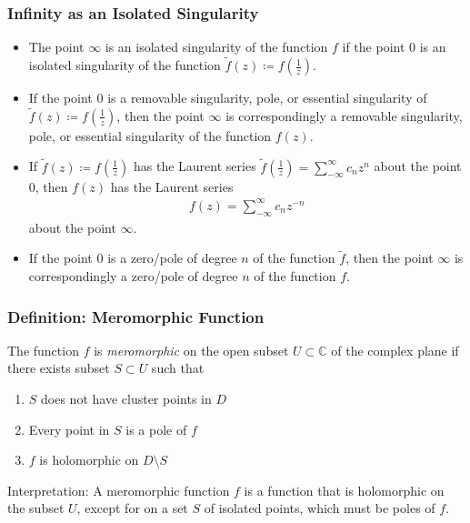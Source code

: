 \documentclass[11pt, a4paper]{article}
\newcommand{\C}{\mathbb{C}} %
\begin{document}
\subsubsection{Infinity as an Isolated Singularity}
\begin{itemize}
	\item The point $ \infty $ is an isolated singularity of the function $ f $ if the point $ 0 $ is an isolated singularity of the function $ \tilde{f}(z) \coloneqq f\left(\frac{1}{z}\right) $.

	\item If the point $ 0 $ is a removable singularity, pole, or essential singularity of $ \tilde{f}(z) \coloneqq f\left(\frac{1}{z}\right) $, then the point $ \infty $ is correspondingly a removable singularity, pole, or essential singularity of the function $ f(z) $.
	
	\item If $ \tilde{f}(z) \coloneqq f\left(\frac{1}{z}\right) $ has the Laurent series $ \displaystyle{	\tilde{f}\left(\frac{1}{z}\right) = \sum_{-\infty}^{\infty} c_n z^{n}} $ about the point $ 0 $, then $ f(z) $ has the Laurent series
	\begin{align*}
		f(z) = \sum_{-\infty}^{\infty} c_n z^{-n}
	\end{align*}
	about the point $ \infty $.
	
	\item If the point $ 0 $ is a zero/pole of degree $ n $ of the function $ \tilde{f} $, then the point $ \infty $ is correspondingly a zero/pole of degree $ n $ of the function $ f $.
\end{itemize}


\subsubsection{Definition: Meromorphic Function}
The function $ f $ is \textit{meromorphic} on the open subset $ U \subset \C $ of the complex plane if there exists subset $ S \subset U $  such that
\begin{enumerate}
	\item $ S $ does not have cluster points in $ D $
	\item Every point in $ S $ is a pole of $ f $
	\item $ f $ is holomorphic on $ D \setminus S $
\end{enumerate}
Interpretation: A meromorphic function $ f $ is a function that is holomorphic on the subset $ U $, except for on a set $ S $ of isolated points, which must be poles of $ f $.
\end{document}
